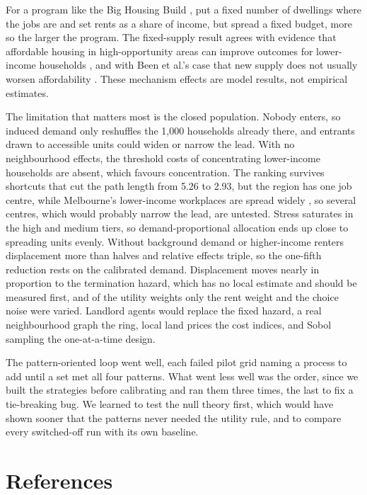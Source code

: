 \documentclass[10pt,a4paper]{article}
\begin{document}
For a program like the Big Housing Build \citep{3}, put a fixed number of dwellings where the jobs are and set rents as a share of income, but spread a fixed budget, more so the larger the program. The fixed-supply result agrees with evidence that affordable housing in high-opportunity areas can improve outcomes for lower-income households \citep{23}, and with Been et al.'s case that new supply does not usually worsen affordability \citep{14}. These mechanism effects are model results, not empirical estimates.

The limitation that matters most is the closed population. Nobody enters, so induced demand only reshuffles the 1,000 households already there, and entrants drawn to accessible units could widen or narrow the lead. With no neighbourhood effects, the threshold costs of concentrating lower-income households \citep{10} are absent, which favours concentration. The ranking survives shortcuts that cut the path length from 5.26 to 2.93, but the region has one job centre, while Melbourne's lower-income workplaces are spread widely \citep{9}, so several centres, which would probably narrow the lead, are untested. Stress saturates in the high and medium tiers, so demand-proportional allocation ends up close to spreading units evenly. Without background demand or higher-income renters displacement more than halves and relative effects triple, so the one-fifth reduction rests on the calibrated demand. Displacement moves nearly in proportion to the termination hazard, which has no local estimate and should be measured first, and of the utility weights only the rent weight and the choice noise were varied. Landlord agents would replace the fixed hazard, a real neighbourhood graph the ring, local land prices the cost indices, and Sobol sampling the one-at-a-time design.

The pattern-oriented loop went well, each failed pilot grid naming a process to add until a set met all four patterns. What went less well was the order, since we built the strategies before calibrating and ran them three times, the last to fix a tie-breaking bug. We learned to test the null theory first, which would have shown sooner that the patterns never needed the utility rule, and to compare every switched-off run with its own baseline.


\FloatBarrier
\section*{References}
\end{document}
